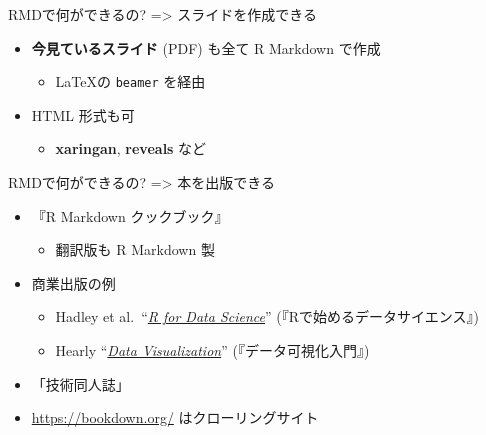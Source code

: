 \documentclass[
  ignorenonframetext,
]{beamer}
\providecommand{\tightlist}{%
  \setlength{\itemsep}{0pt}\setlength{\parskip}{0pt}}
\begin{document}
\begin{frame}[fragile]{RMDで何ができるの? =\textgreater{} スライドを作成できる}
\protect\hypertarget{rmdux3067ux4f55ux304cux3067ux304dux308bux306e-ux30b9ux30e9ux30a4ux30c9ux3092ux4f5cux6210ux3067ux304dux308b}{}
\begin{itemize}
\item
  \textbf{今見ているスライド} (PDF) も全て R Markdown で作成

  \begin{itemize}
  \tightlist
  \item
    \LaTeX の \texttt{beamer} を経由
  \end{itemize}
\item
  HTML 形式も可

  \begin{itemize}
  \tightlist
  \item
    \textbf{xaringan}, \textbf{reveals} など
  \end{itemize}
\end{itemize}
\end{frame}

\begin{frame}{RMDで何ができるの? =\textgreater{} 本を出版できる}
\protect\hypertarget{rmdux3067ux4f55ux304cux3067ux304dux308bux306e-ux672cux3092ux51faux7248ux3067ux304dux308b}{}
\begin{itemize}
\item
  『R Markdown クックブック』

  \begin{itemize}
  \tightlist
  \item
    翻訳版も R Markdown 製
  \end{itemize}
\item
  商業出版の例

  \begin{itemize}
  \tightlist
  \item
    Hadley et al.~``\href{https://r4ds.had.co.nz/}{\emph{R for Data Science}}''
    (『Rで始めるデータサイエンス』)
  \item
    Hearly ``\href{https://socviz.co/}{\emph{Data Visualization}}''
    (『データ可視化入門』)
  \end{itemize}
\item
  「技術同人誌」
\item
  \url{https://bookdown.org/} はクローリングサイト
\end{itemize}
\end{frame}
\end{document}
